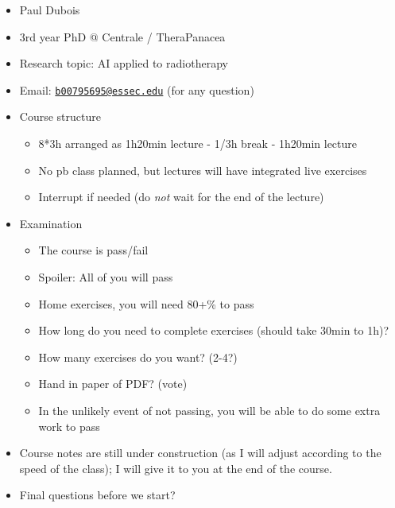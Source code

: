 \documentclass[a4paper,12pt]{article}
\providecommand{\tightlist}{\setlength{\itemsep}{0pt}\setlength{\parskip}{0pt}}
\begin{document}
	\begin{itemize}
	\tightlist
	\item
	Paul Dubois
	\item
	3rd year PhD @ Centrale / TheraPanacea
	\item
	Research topic: AI applied to radiotherapy
	\item
	Email:
	\href{mailto:b00795695@essec.edu}{\nolinkurl{b00795695@essec.edu}}
	(for any question)
	\item
	Course structure
	
	\begin{itemize}
		\tightlist
		\item
		8*3h arranged as 1h20min lecture - 1/3h break - 1h20min lecture
		\item
		No pb class planned, but lectures will have integrated live
		exercises
		\item
		Interrupt if needed (do \emph{not} wait for the end of the lecture)
	\end{itemize}
	\item
	Examination
	
	\begin{itemize}
		\tightlist
		\item
		The course is pass/fail
		\item
		Spoiler: All of you will pass
		\item
		Home exercises, you will need 80+\% to pass
		\item
		How long do you need to complete exercises (should take 30min to
		1h)?
		\item
		How many exercises do you want? (2-4?)
		\item
		Hand in paper of PDF? (vote)
		\item
		In the unlikely event of not passing, you will be able to do some
		extra work to pass
	\end{itemize}
	\item
	Course notes are still under construction (as I will adjust according
	to the speed of the class); I will give it to you at the end of the
	course.
	\item
	Final questions before we start?
	\end{itemize}
	
	
	
\end{document}
